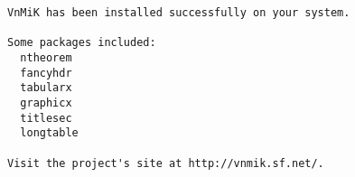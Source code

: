 \documentclass{article}
\begin{document}
\begin{verbatim}
VnMiK has been installed successfully on your system.

Some packages included:
  ntheorem
  fancyhdr
  tabularx
  graphicx
  titlesec
  longtable

Visit the project's site at http://vnmik.sf.net/.  
\end{verbatim}
\end{document}
